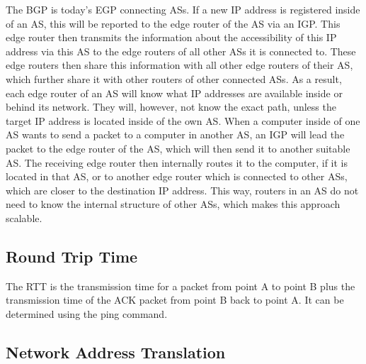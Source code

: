 The \ac{BGP} is today's \acs{EGP} connecting \acp{AS}. If a new IP address is registered inside of an \ac{AS}, this will be reported to the edge router of the \ac{AS} via an \ac{IGP}. This edge router then transmits the information about the accessibility of this IP address via this \ac{AS} to the edge routers of all other \acp{AS} it is connected to. These edge routers then share this information with all other edge routers of their \ac{AS}, which further share it with other routers of other connected \acp{AS}. As a result, each edge router of an \ac{AS} will know what IP addresses are available inside or behind its network. They will, however, not know the exact path, unless the target IP address is located inside of the own \ac{AS}. When a computer inside of one \ac{AS} wants to send a packet to a computer in another \ac{AS}, an \ac{IGP} will lead the packet to the edge router of the \ac{AS}, which will then send it to another suitable \ac{AS}. The receiving edge router then internally routes it to the computer, if it is located in that \ac{AS}, or to another edge router which is connected to other \acp{AS}, which are closer to the destination IP address. This way, routers in an \ac{AS} do not need to know the internal structure of other \acp{AS}, which makes this approach scalable.

\subsection{Round Trip Time}

The \ac{RTT} is the transmission time for a packet from point A to point B plus the transmission time of the ACK packet from point B back to point A. It can be determined using the ping command.

\subsection{Network Address Translation}


